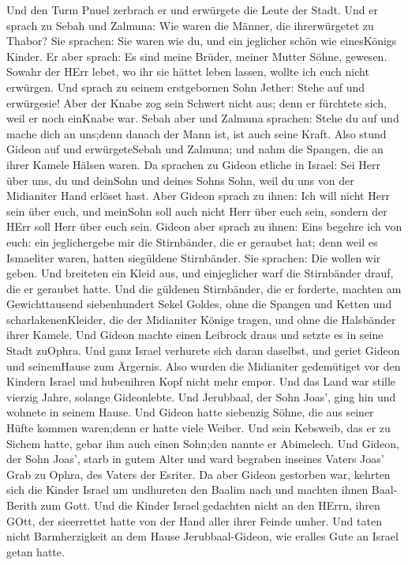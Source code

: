  Und den Turm Pnuel zerbrach er und erwürgete die Leute der
Stadt.  Und er sprach zu Sebah und Zalmuna: Wie waren die
Männer, die ihrerwürgetet zu Thabor? Sie sprachen: Sie waren wie du, und
ein jeglicher schön wie einesKönigs Kinder.  Er aber
sprach: Es sind meine Brüder, meiner Mutter Söhne, gewesen. Sowahr der
HErr lebet, wo ihr sie hättet leben lassen, wollte ich euch nicht
erwürgen.  Und sprach zu seinem erstgebornen Sohn Jether:
Stehe auf und erwürgesie! Aber der Knabe zog sein Schwert nicht aus;
denn er fürchtete sich, weil er noch einKnabe war.  Sebah
aber und Zalmuna sprachen: Stehe du auf und mache dich an uns;denn
danach der Mann ist, ist auch seine Kraft. Also stund Gideon auf und
erwürgeteSebah und Zalmuna; und nahm die Spangen, die an ihrer Kamele
Hälsen waren.  Da sprachen zu Gideon etliche in Israel: Sei
Herr über uns, du und deinSohn und deines Sohns Sohn, weil du uns von
der Midianiter Hand erlöset hast.  Aber Gideon sprach zu
ihnen: Ich will nicht Herr sein über euch, und meinSohn soll auch nicht
Herr über euch sein, sondern der HErr soll Herr über euch sein.
 Gideon aber sprach zu ihnen: Eins begehre ich von euch:
ein jeglichergebe mir die Stirnbänder, die er geraubet hat; denn weil es
Ismaeliter waren, hatten siegüldene Stirnbänder.  Sie
sprachen: Die wollen wir geben. Und breiteten ein Kleid aus, und
einjeglicher warf die Stirnbänder drauf, die er geraubet hatte.
 Und die güldenen Stirnbänder, die er forderte, machten am
Gewichttausend siebenhundert Sekel Goldes, ohne die Spangen und Ketten
und scharlakenenKleider, die der Midianiter Könige tragen, und ohne die
Halsbänder ihrer Kamele.  Und Gideon machte einen Leibrock
draus und setzte es in seine Stadt zuOphra. Und ganz Israel verhurete
sich daran daselbst, und geriet Gideon und seinemHause zum Ärgernis.
 Also wurden die Midianiter gedemütiget vor den Kindern
Israel und hubenihren Kopf nicht mehr empor. Und das Land war stille
vierzig Jahre, solange Gideonlebte.  Und Jerubbaal, der
Sohn Joas', ging hin und wohnete in seinem Hause.  Und
Gideon hatte siebenzig Söhne, die aus seiner Hüfte kommen waren;denn er
hatte viele Weiber.  Und sein Kebsweib, das er zu Sichem
hatte, gebar ihm auch einen Sohn;den nannte er Abimelech. 
Und Gideon, der Sohn Joas', starb in gutem Alter und ward begraben
inseines Vaters Joas' Grab zu Ophra, des Vaters der Esriter.
 Da aber Gideon gestorben war, kehrten sich die Kinder
Israel um undhureten den Baalim nach und machten ihnen Baal-Berith zum
Gott.  Und die Kinder Israel gedachten nicht an den HErrn,
ihren GOtt, der sieerrettet hatte von der Hand aller ihrer Feinde umher.
 Und taten nicht Barmherzigkeit an dem Hause
Jerubbaal-Gideon, wie eralles Gute an Israel getan hatte.

